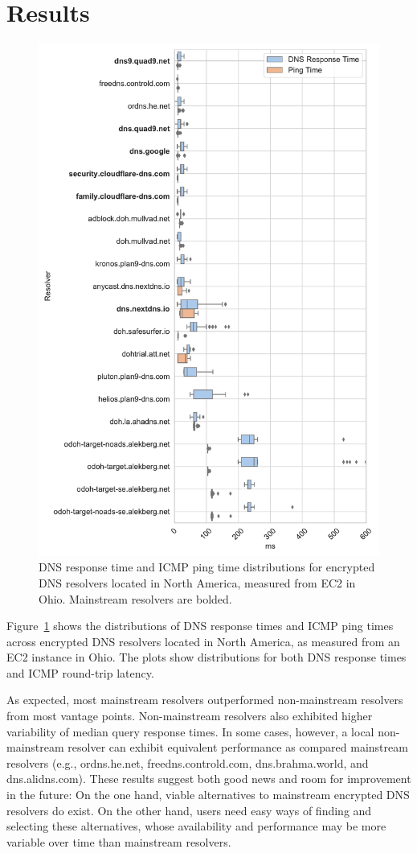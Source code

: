 \section{Results}\label{sec:results}

\begin{figure}[!htbp]
\centering
\includegraphics[width=0.6\columnwidth]{figures/ohio_NA.pdf}
\caption{DNS response time and ICMP ping time distributions for
    encrypted DNS resolvers located in North America, measured from EC2 in Ohio. Mainstream resolvers are bolded.}
    \label{fig:dns-us-ohio}
\end{figure}

Figure~\ref{fig:dns-us-ohio} shows the distributions of DNS response times and
ICMP ping times across encrypted DNS resolvers located in North America, as
measured from an EC2 instance in Ohio. The plots show distributions for both DNS response times and ICMP round-trip latency.

As expected, most mainstream resolvers outperformed non-mainstream resolvers from most vantage points. Non-mainstream resolvers also exhibited higher variability of median query response times. In some cases, however, a local non-mainstream resolver can exhibit equivalent performance as compared mainstream resolvers (e.g., ordns.he.net, freedns.controld.com, dns.brahma.world, and dns.alidns.com). These results suggest both good news and room for improvement in the future: On the one hand, viable alternatives to mainstream encrypted DNS resolvers do exist. On the other hand, users need easy ways of finding and selecting these alternatives, whose availability and performance may be more variable over time than mainstream resolvers.

